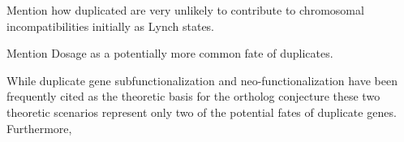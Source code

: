 

Mention how duplicated are very unlikely to contribute to chromosomal incompatibilities initially as Lynch states.

Mention Dosage as a potentially more common fate of duplicates.

While duplicate gene subfunctionalization and neo-functionalization have been frequently cited as the theoretic basis for the ortholog conjecture these two theoretic scenarios represent only two of the potential fates of duplicate genes.  Furthermore, 